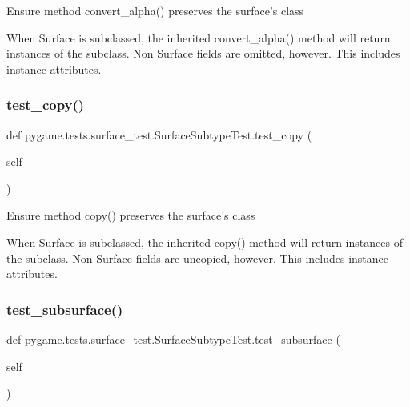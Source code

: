 \begin{DoxyVerb}Ensure method convert_alpha() preserves the surface's class

When Surface is subclassed, the inherited convert_alpha() method will
return instances of the subclass. Non Surface fields are omitted,
however. This includes instance attributes.
\end{DoxyVerb}
 \mbox{\label{classpygame_1_1tests_1_1surface__test_1_1_surface_subtype_test_ab7de3c2fd97612dd92a417d44b0b88f2}} 
\subsubsection{\texorpdfstring{test\+\_\+copy()}{test\_copy()}}
{\footnotesize\ttfamily def pygame.\+tests.\+surface\+\_\+test.\+Surface\+Subtype\+Test.\+test\+\_\+copy (\begin{DoxyParamCaption}\item[{}]{self }\end{DoxyParamCaption})}

\begin{DoxyVerb}Ensure method copy() preserves the surface's class

When Surface is subclassed, the inherited copy() method will return
instances of the subclass. Non Surface fields are uncopied, however.
This includes instance attributes.
\end{DoxyVerb}
 \mbox{\label{classpygame_1_1tests_1_1surface__test_1_1_surface_subtype_test_ae79bff683e2fd610bb550d2d4e242bf4}} 
\subsubsection{\texorpdfstring{test\+\_\+subsurface()}{test\_subsurface()}}
{\footnotesize\ttfamily def pygame.\+tests.\+surface\+\_\+test.\+Surface\+Subtype\+Test.\+test\+\_\+subsurface (\begin{DoxyParamCaption}\item[{}]{self }\end{DoxyParamCaption})}


